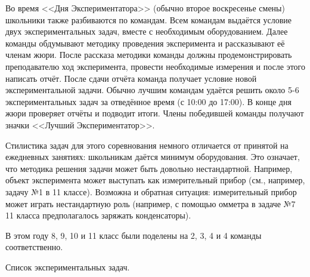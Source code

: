 \documentclass[12pt,a4paper,oneside]{scrartcl}
\newlength{\h}
\newlength{\x}
\begin{document}
Во время <<Дня Экспериментатора>> (обычно второе воскресенье смены)
школьники также разбиваются по командам. Всем командам выдаётся
условие двух экспериментальных задач, вместе с необходимым
оборудованием. Далее команды обдумывают методику проведения
эксперимента и рассказывают её членам жюри. После рассказа методики
команды должны продемонстрировать преподавателю ход эксперимента,
провести необходимые измерения и после этого написать отчёт. После
сдачи отчёта команда получает условие новой экспериментальной
задачи. Обычно лучшим командам удаётся решить около 5-6
экспериментальных задач за отведённое время (с 10:00 до 17:00). В
конце дня жюри проверяет отчёты и подводит итоги. Члены победившей
команды получают значки <<Лучший Экспериментатор>>.

Стилистика задач для этого соревнования немного отличается от принятой
на ежедневных занятиях: школьникам даётся минимум оборудования. Это
означает, что методика решения задачи может быть довольно
нестандартной. Например, объект эксперимента может выступать как
измерительный прибор (см., например, задачу №1 в 11 классе). Возможна
и обратная ситуация: измерительный прибор может играть нестандартную
роль (например, с помощью омметра в задаче №7 11 класса
предполагалось заряжать конденсаторы). 

В этом году 8, 9, 10 и 11 класс были поделены на 2, 3, 4 и 4 команды
соответственно. 

\begin{center}
  \textsf{Список экспериментальных задач.}
\end{center}
\end{document}
